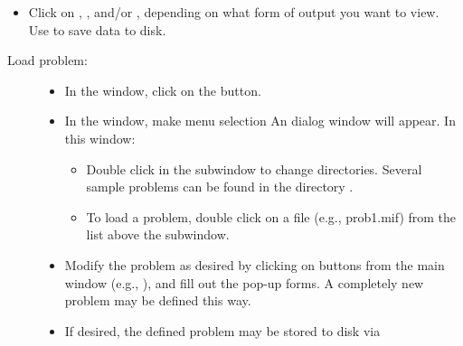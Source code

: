 \begin{list}{}{\setlength{\labelwidth}{0pt}
               \setlength{\leftmargin}{0pt}
               \setlength{\rightmargin}{\leftmargin}
               \setlength{\itemsep}{0pt}}
\begin{itemize}
\begin{itemize}
                   to form x-y plots
       \item {}
                   to view or modify a problem for 
                   or 
       \item {}
                   to control the 2D solver
       \item {}
                   to control the 3D solver
    \end{itemize}
    \item Click on , , and/or
          , depending on what form of output you
          want to view.  Use  to save data to disk.
  \end{itemize}
  \item {}
    \begin{description}
    \item[Load problem:]\blankspace
    \begin{itemize}
      \item In the  window, click on the 
            button. 
      \item In the
            window, make menu selection
              An  dialog window
            will appear.  In this window:
      \begin{itemize}
        \item Double click in the  subwindow to change
              directories.  Several sample problems can be found in
              the directory .
        \item To load a problem, double click on a  file
              (e.g., prob1.mif) from the list above the 
              subwindow.
      \end{itemize}
      \item Modify the problem as desired by clicking on buttons from
            the main  window (e.g., ), and fill out the pop-up forms.  A
            completely new problem may be defined this way.
      \item If desired, the defined problem may be stored to disk via

\end{itemize}
\end{description}
\end{list}
